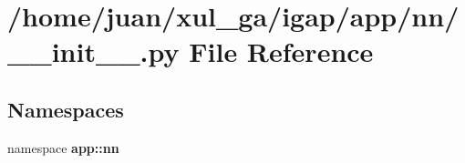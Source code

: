 \section{/home/juan/xul\_\-ga/igap/app/nn/\_\-\_\-init\_\-\_\-.py File Reference}
\label{app_2nn_2____init_____8py}
\subsection*{Namespaces}
\begin{CompactItemize}
\item 
namespace {\bf app::nn}
\end{CompactItemize}
